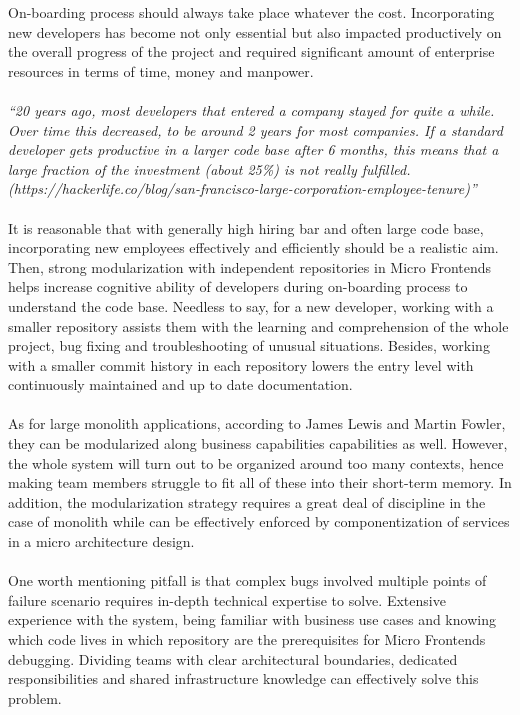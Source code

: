 \documentclass[a4paper]{book}
\begin{document}
On-boarding process should always take place whatever the cost. Incorporating new developers has become not only essential but also impacted productively on the overall progress of the project and required significant amount of enterprise resources in terms of time, money and manpower. 
\\ 
\\
\textit{“20 years ago, most developers that entered a company stayed for quite a while. Over time this decreased, to be around 2 years for most companies. If a standard developer gets productive in a larger code base after 6 months, this means that a large fraction of the investment (about 25\%) is not really fulfilled.  (https://hackerlife.co/blog/san-francisco-large-corporation-employee-tenure)”} \cite{Rap20}
\\
\\
It is reasonable that with generally high hiring bar and often large code base, incorporating new employees effectively and efficiently should be a realistic aim. Then, strong modularization with independent repositories in Micro Frontends helps increase cognitive ability of developers during on-boarding process to understand the code base. Needless to say, for a new developer, working with a smaller repository assists them with the learning and comprehension of the whole project, bug fixing and troubleshooting of unusual situations. Besides, working with a smaller commit history in each repository lowers the entry level with continuously maintained and up to date documentation. \cite{Rap20}
\\
\\
As for large monolith applications, according to James Lewis and Martin Fowler, they can be modularized  along business capabilities capabilities as well. However, the whole system will turn out to be organized around too many contexts, hence making team members struggle to fit all of these into their short-term memory. In addition, the modularization strategy requires a great deal of discipline in the case of monolith while can be effectively enforced by componentization of services in a micro architecture design. \cite{Lew14}
\\
\\
One worth mentioning pitfall is that complex bugs involved multiple points of failure scenario requires in-depth technical expertise to solve. Extensive experience with the system, being familiar with business use cases and knowing which code lives in which repository are the prerequisites for Micro Frontends debugging. Dividing teams with clear architectural boundaries, dedicated responsibilities and shared infrastructure knowledge can effectively solve this problem.
\end{document}

